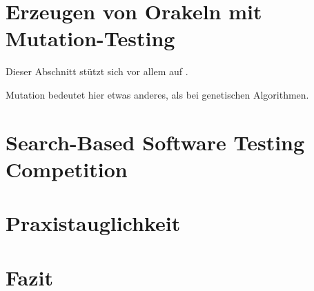 \documentclass[a4paper,11pt]{article}
\begin{document}
\section{Erzeugen von Orakeln mit Mutation-Testing}

Dieser Abschnitt stützt sich vor allem auf \cite{TSE12_Mutation}.

Mutation bedeutet hier etwas anderes, als bei genetischen Algorithmen.

\section{Search-Based Software Testing Competition}

\section{Praxistauglichkeit}

\section{Fazit}



\end{document}
